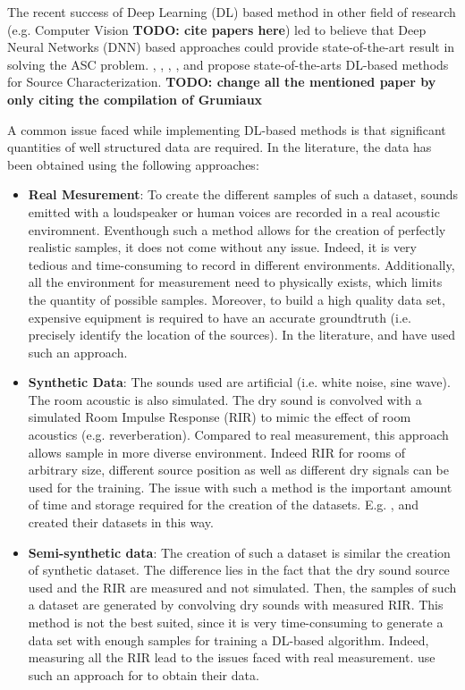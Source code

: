 \documentclass[11pt,a4paper,twoside]{report}
\begin{document}
The recent success of Deep Learning (DL) based method in other field of research (e.g. Computer Vision \textbf{TODO: cite papers here}) led to believe that Deep Neural Networks (DNN) based approaches could provide state-of-the-art result in solving the ASC problem. \cite{castellini2021neural}, \cite{kujawski2019deep}, \cite{lee2021deep}, \cite{ma2019phased}, \cite{pinto2021deconvoluting} and \cite{xu2021deep} propose state-of-the-arts DL-based methods for Source Characterization. \textbf{TODO: change all the mentioned paper by only citing the compilation of Grumiaux}


A common issue faced while implementing DL-based methods is that significant quantities of well structured data are required. In the literature, the data has been obtained using the following approaches:

\begin{itemize}
    \item \textbf{Real Mesurement}: To create the different samples of such a dataset, sounds emitted with a loudspeaker or human voices are recorded in a real acoustic enviromnent. Eventhough such a method allows for the creation of perfectly realistic samples, it does not come without any issue. Indeed, it is very tedious and time-consuming to record in different environments. Additionally, all the environment for measurement need to physically exists, which limits the quantity of possible samples. Moreover, to build a high quality data set, expensive equipment is required to have an accurate groundtruth (i.e. precisely identify the location of the sources). In the literature, \cite{he2018deep} and \cite{ferguson2018sound} have used such an approach.
    \item \textbf{Synthetic Data}: The sounds used are artificial (i.e. white noise, sine wave). The room acoustic is also simulated. The dry sound is convolved with a simulated Room Impulse Response (RIR) to mimic the effect of room acoustics (e.g. reverberation). Compared to real measurement, this approach allows sample in more diverse environment. Indeed RIR for rooms of arbitrary size, different source position as well as different dry signals can be used for the training. The issue with such a method is the important amount of time and storage required for the creation of the datasets. E.g. \cite{chakrabarty2017broadband}, \cite{perotin2018crnn} and \cite{adavanne2018direction} created their datasets in this way.
    \item \textbf{Semi-synthetic data}: The creation of such a dataset is similar the creation of synthetic dataset. The difference lies in the fact that the dry sound source used and the RIR are measured and not simulated. Then, the samples of such a dataset are generated by convolving dry sounds with measured RIR. This method is not the best suited, since it is very time-consuming to generate a data set with enough samples for training a DL-based algorithm. Indeed, measuring all the RIR lead to the issues faced with real measurement. \cite{takeda2016sound} use such an approach for to obtain their data.
\end{itemize}
\end{document}
